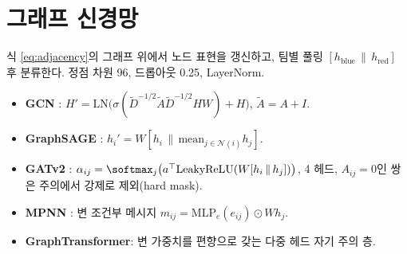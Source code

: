 
\section{그래프 신경망}
\label{sec:model-gnn}

식 \eqref{eq:adjacency}의 그래프 위에서 노드 표현을 갱신하고, 팀별 풀링 $[h_{\mathrm{blue}} \,\|\, h_{\mathrm{red}}]$ 후 분류한다. 정점 차원 96, 드롭아웃 0.25, LayerNorm.

\begin{itemize}[leftmargin=1.5em]
  \item \textbf{GCN} \cite{kipf2017semi}: $H' = \mathrm{LN}\big(\sigma(\tilde D^{-1/2}\tilde A\tilde D^{-1/2} H W) + H\big)$, $\tilde A = A + I$.
  \item \textbf{GraphSAGE} \cite{hamilton2017inductive}: $h_i' = W[h_i \,\|\, \mathrm{mean}_{j \in \mathcal{N}(i)} h_j]$.
  \item \textbf{GATv2} \cite{brody2022how}: $\alpha_{ij} = \softmax_j\big(a^\top \mathrm{LeakyReLU}(W[h_i \,\|\, h_j])\big)$, 4 헤드, $A_{ij} = 0$인 쌍은 주의에서 강제로 제외(hard mask).
  \item \textbf{MPNN} \cite{gilmer2017neural}: 변 조건부 메시지 $m_{ij} = \mathrm{MLP}_e(e_{ij}) \odot W h_j$.
  \item \textbf{GraphTransformer}: 변 가중치를 편향으로 갖는 다중 헤드 자기 주의 층.
\end{itemize}
